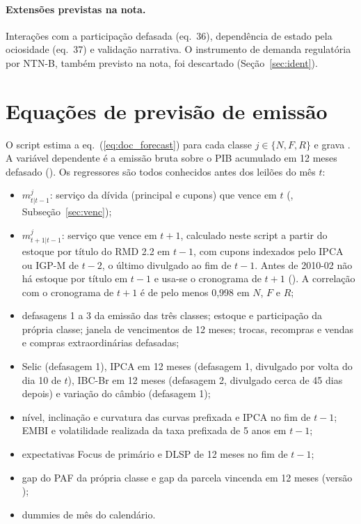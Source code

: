 \documentclass[12pt,a4paper]{article}
\begin{document}
\paragraph{Extensões previstas na nota.} Interações com a participação defasada
(eq.~36), dependência de estado pela ociosidade (eq.~37) e validação narrativa. O
instrumento de demanda regulatória por NTN-B, também previsto na nota, foi
descartado (Seção~\ref{sec:ident}).

\section{Equações de previsão de emissão}\label{sec:prev}

O script  estima a eq.~(\ref{eq:doc_forecast}) para cada classe
\(j\in\{N,F,R\}\) e grava
. A variável dependente é a emissão bruta sobre o PIB acumulado em 12 meses
defasado (). Os regressores são todos conhecidos antes dos leilões do
mês \(t\):

\begin{itemize}[leftmargin=1.2cm]
    \item \(m_{t|t-1}^j\): serviço da dívida (principal e cupons) que vence em \(t\)
    (, Subseção~\ref{sec:venc});
    \item \(m_{t+1|t-1}^j\): serviço que vence em \(t+1\), calculado neste script a
    partir do estoque por título do RMD 2.2 em \(t-1\), com cupons indexados pelo IPCA
    ou IGP-M de \(t-2\), o último divulgado ao fim de \(t-1\). Antes de 2010-02 não há
    estoque por título em \(t-1\) e usa-se o cronograma de \(t+1\)
    (). A correlação com o cronograma de \(t+1\) é de pelo
    menos 0,998 em \(N\), \(F\) e \(R\);
    \item defasagens 1 a 3 da emissão das três classes; estoque e participação da
    própria classe; janela de vencimentos de 12 meses; trocas, recompras e vendas e
    compras extraordinárias defasadas;
    \item Selic (defasagem 1), IPCA em 12 meses (defasagem 1, divulgado por volta do
    dia 10 de \(t\)), IBC-Br em 12 meses (defasagem 2, divulgado cerca de 45 dias
    depois) e variação do câmbio (defasagem 1);
    \item nível, inclinação e curvatura das curvas prefixada e IPCA no fim de \(t-1\);
    EMBI e volatilidade realizada da taxa prefixada de 5 anos em \(t-1\);
    \item expectativas Focus de primário e DLSP de 12 meses no fim de \(t-1\);
    \item gap do PAF da própria classe e gap da parcela vincenda em 12 meses (versão
    );
    \item dummies de mês do calendário.
\end{itemize}
\end{document}
